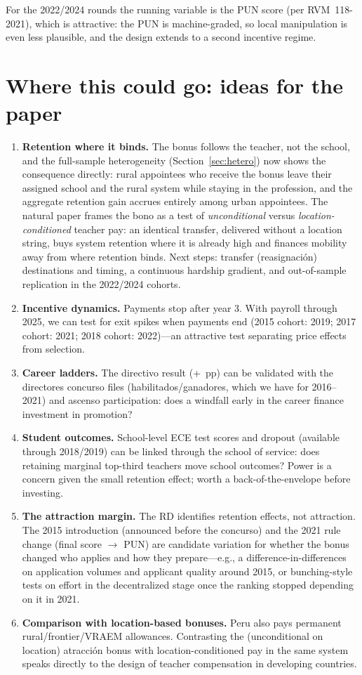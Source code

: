 \documentclass[11pt]{article}
\begin{document}
For the 2022/2024 rounds the running variable is the PUN score (per
RVM~118-2021), which is attractive: the PUN is machine-graded, so local
manipulation is even less plausible, and the design extends to a second
incentive regime.

\section{Where this could go: ideas for the paper}\label{sec:ideas}

\begin{enumerate}
\item \textbf{Retention where it binds.} The bonus follows the teacher, not
the school, and the full-sample heterogeneity (Section~\ref{sec:hetero}) now
shows the consequence directly: rural appointees who receive the bonus leave
their assigned school and the rural system while staying in the profession,
and the aggregate retention gain accrues entirely among urban appointees.
The natural paper frames the bono as a test of \emph{unconditional} versus
\emph{location-conditioned} teacher pay: an identical transfer, delivered
without a location string, buys system retention where it is already high
and finances mobility away from where retention binds. Next steps: transfer
(reasignaci\'on) destinations and timing, a continuous hardship gradient,
and out-of-sample replication in the 2022/2024 cohorts.
\item \textbf{Incentive dynamics.} Payments stop after year 3. With payroll
through 2025, we can test for exit spikes when payments end
(2015 cohort: 2019; 2017 cohort: 2021; 2018 cohort: 2022)---an
attractive test separating price effects from selection.
\item \textbf{Career ladders.} The directivo result (+\DirectorRF~pp) can be
validated with the directores concurso files (habilitados/ganadores, which we
have for 2016--2021) and ascenso participation: does a windfall early in the
career finance investment in promotion?
\item \textbf{Student outcomes.} School-level ECE test scores and dropout
(available through 2018/2019) can be linked through the school of service:
does retaining marginal top-third teachers move school outcomes? Power is a
concern given the small retention effect; worth a back-of-the-envelope before
investing.
\item \textbf{The attraction margin.} The RD identifies retention effects,
not attraction. The 2015 introduction (announced before the concurso) and the
2021 rule change (final score $\to$ PUN) are candidate variation for whether
the bonus changed who applies and how they prepare---e.g., a
difference-in-differences on application volumes and applicant quality around
2015, or bunching-style tests on effort in the decentralized stage once the
ranking stopped depending on it in 2021.
\item \textbf{Comparison with location-based bonuses.} Peru also pays
permanent rural/frontier/VRAEM allowances. Contrasting the (unconditional on
location) atracci\'on bonus with location-conditioned pay in the same system
speaks directly to the design of teacher compensation in developing
countries.
\end{enumerate}
\end{document}

